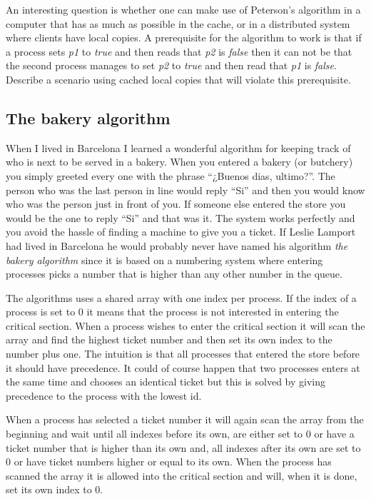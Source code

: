 \documentclass[a4paper,11pt]{article}
\begin{document}
An interesting question is whether one can make use of Peterson's
algorithm in a computer that has as much as possible in the cache, or
in a distributed system where clients have local copies. A
prerequisite for the algorithm to work is that if a process sets {\em
  p1} to {\em true} and then reads that {\em p2} is {\em false} then
it can not be that the second process manages to set {\em p2} to {\em
  true} and then read that {\em p1} is {\em false}. Describe a
scenario using cached local copies that will violate this prerequisite.


\subsection{The bakery algorithm}

When I lived in Barcelona I learned a wonderful algorithm for keeping
track of who is next to be served in a bakery. When you entered a
bakery (or butchery) you simply greeted every one with the phrase
``¿Buenos dias, ultimo?''. The person who was the last person in line
would reply ``Si'' and then you would know who was the person just in
front of you. If someone else entered the store you would be the one
to reply ``Si'' and that was it. The system works perfectly and you
avoid the hassle of finding a machine to give you a ticket. If Leslie
Lamport had lived in Barcelona he would probably never have named his
algorithm {\em the bakery algorithm} since it is based on a numbering
system where entering processes picks a number that is higher than any
other number in the queue.

The algorithms uses a shared array with one index per process. If the
index of a process is set to $0$
it means that the process is not interested in entering the
critical section. When a process wishes to enter the critical section it
will scan the array and find the highest ticket number and then set
its own index to the number plus one. The intuition is that all
processes that entered the store before it should have precedence. It
could of course happen that two processes enters at the same time and
chooses an identical ticket but this is solved by giving precedence to
the process with the lowest id.

When a process has selected a ticket number it will again scan the
array from the beginning and wait until all indexes before its own, are
either set to $0$
or have a ticket number that is higher than its own and, all indexes
after its own are set to $0$
or have ticket numbers higher or equal to its own. When the process
has scanned the array it is allowed into the critical section and will,
when it is done, set its own index to $0$.
\end{document}
